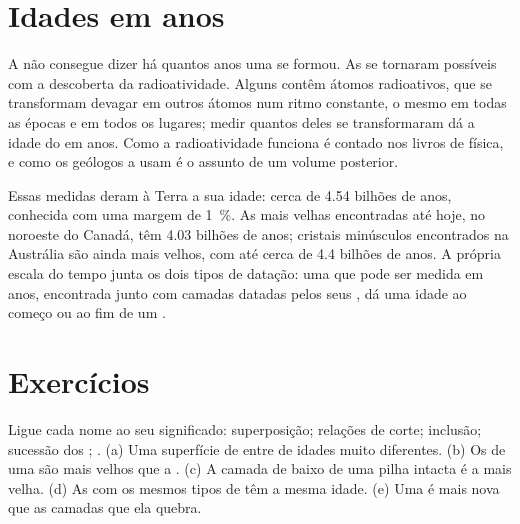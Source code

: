 \section{Idades em anos}

A  não consegue dizer há quantos anos uma  se
formou. As  se tornaram possíveis com a descoberta da
radioatividade. Alguns  contêm átomos radioativos, que se
transformam devagar em outros átomos num ritmo constante, o mesmo em
todas as épocas e em todos os lugares; medir quantos deles se
transformaram dá a idade do  em anos. Como a radioatividade
funciona é contado nos livros de física, e como os geólogos a usam é o
assunto de um volume posterior.

Essas medidas deram à Terra a sua idade: cerca de \num{4.54} bilhões de
anos, conhecida com uma margem de 1~\%. As  mais velhas encontradas até hoje,
no noroeste do Canadá, têm \num{4.03} bilhões de anos; cristais
minúsculos encontrados na Austrália são ainda mais velhos, com até cerca
de \num{4.4} bilhões de anos. A própria escala do tempo junta os dois
tipos de datação: uma  que pode ser medida em anos, encontrada junto
com camadas datadas pelos seus , dá uma idade ao começo ou ao fim
de um .

\section{Exercícios}

\begin{exercise}[$\star$]\label{exo:g7:geological-time:1}
Ligue cada nome ao seu significado: superposição; relações de corte;
inclusão; sucessão dos ; . (a) Uma superfície de
 entre  de idades muito diferentes. (b) Os  de uma
 são mais velhos que a . (c) A camada de baixo de uma pilha
intacta é a mais velha. (d) As  com os mesmos tipos de  têm
a mesma idade. (e) Uma  é mais nova que as camadas que ela quebra.
\end{exercise}


